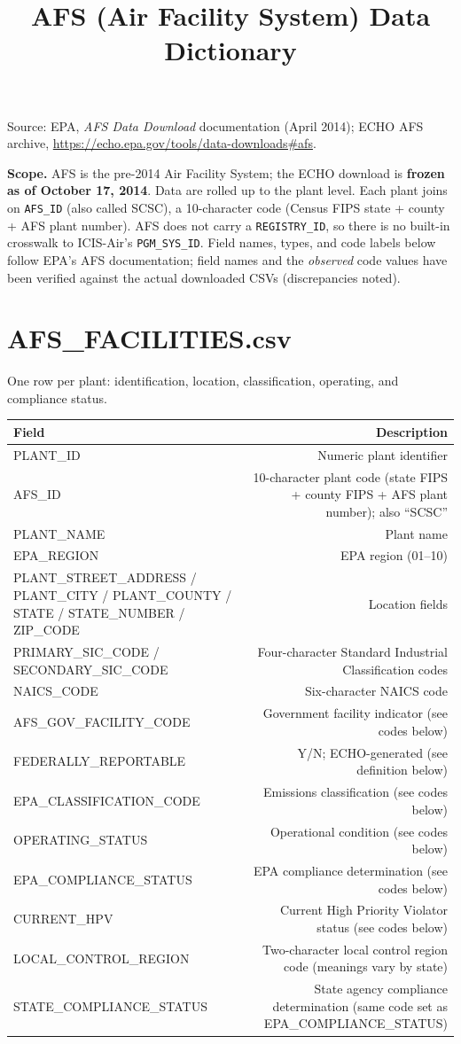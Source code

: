\documentclass[11pt]{article}
\title{AFS (Air Facility System) Data Dictionary}
\author{}
\date{}
\begin{document}
\maketitle

\noindent Source: EPA, \emph{AFS Data Download} documentation (April 2014); ECHO AFS archive,
\url{https://echo.epa.gov/tools/data-downloads\#afs}.

\medskip
\noindent\textbf{Scope.} AFS is the pre-2014 Air Facility System; the ECHO download is \textbf{frozen as
of October 17, 2014}. Data are rolled up to the plant level. Each plant joins on \texttt{AFS\_ID} (also
called SCSC), a 10-character code (Census FIPS state + county + AFS plant number). AFS does not carry a
\texttt{REGISTRY\_ID}, so there is no built-in crosswalk to ICIS-Air's \texttt{PGM\_SYS\_ID}. Field names,
types, and code labels below follow EPA's AFS documentation; field names and the \emph{observed} code
values have been verified against the actual downloaded CSVs (discrepancies noted).

\section*{AFS\_FACILITIES.csv}
One row per plant: identification, location, classification, operating, and compliance status.
\begin{longtable}{F D}
\toprule
Field & Description \\ \midrule \endhead
PLANT\_ID & Numeric plant identifier \\
AFS\_ID & 10-character plant code (state FIPS + county FIPS + AFS plant number); also ``SCSC'' \\
PLANT\_NAME & Plant name \\
EPA\_REGION & EPA region (01--10) \\
PLANT\_STREET\_ADDRESS / PLANT\_CITY / PLANT\_COUNTY / STATE / STATE\_NUMBER / ZIP\_CODE & Location fields \\
PRIMARY\_SIC\_CODE / SECONDARY\_SIC\_CODE & Four-character Standard Industrial Classification codes \\
NAICS\_CODE & Six-character NAICS code \\
AFS\_GOV\_FACILITY\_CODE & Government facility indicator (see codes below) \\
FEDERALLY\_REPORTABLE & Y/N; ECHO-generated (see definition below) \\
EPA\_CLASSIFICATION\_CODE & Emissions classification (see codes below) \\
OPERATING\_STATUS & Operational condition (see codes below) \\
EPA\_COMPLIANCE\_STATUS & EPA compliance determination (see codes below) \\
CURRENT\_HPV & Current High Priority Violator status (see codes below) \\
LOCAL\_CONTROL\_REGION & Two-character local control region code (meanings vary by state) \\
STATE\_COMPLIANCE\_STATUS & State agency compliance determination (same code set as EPA\_COMPLIANCE\_STATUS) \\
\bottomrule
\end{longtable}
\end{document}
